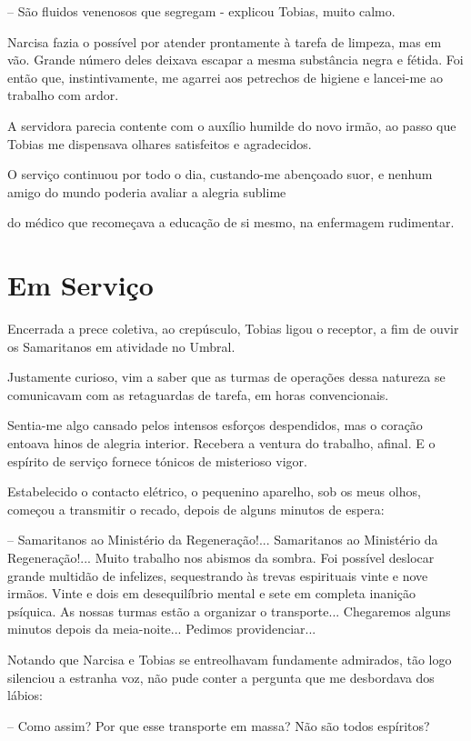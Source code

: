 \documentclass[portuguese,12pt,a4paper]{scrbook}
\begin{document}
	– São fluidos venenosos que segregam - explicou Tobias, muito calmo.
	
	Narcisa fazia o possível por atender prontamente à tarefa de limpeza, mas em vão. Grande número deles deixava escapar a mesma substância negra e fétida. Foi então que, instintivamente, me agarrei aos petrechos de higiene e lancei-me ao trabalho com ardor.
	
	A servidora parecia contente com o auxílio humilde do novo irmão, ao passo que Tobias me dispensava olhares satisfeitos e agradecidos.
	
	O serviço continuou por todo o dia, custando-me abençoado suor, e nenhum amigo do mundo poderia avaliar a alegria sublime
	
	
	do médico que recomeçava a educação de si mesmo, na enfermagem rudimentar.
	
	
	\chapter{Em Serviço}
	
	Encerrada a prece coletiva, ao crepúsculo, Tobias ligou o receptor, a fim de ouvir os Samaritanos em atividade no Umbral.
	
	Justamente curioso, vim a saber que as turmas de operações dessa natureza se comunicavam com as retaguardas de tarefa, em horas convencionais.
	
	Sentia-me algo cansado pelos intensos esforços despendidos, mas o coração entoava hinos de alegria interior. Recebera a ventura do trabalho, afinal. E o espírito de serviço fornece tónicos de misterioso vigor.
	
	Estabelecido o contacto elétrico, o pequenino aparelho, sob os meus olhos, começou a transmitir o recado, depois de alguns minutos de espera:
	
	– Samaritanos ao Ministério da Regeneração!... Samaritanos ao Ministério da Regeneração!... Muito trabalho nos abismos da sombra. Foi possível deslocar grande multidão de infelizes, sequestrando às trevas espirituais vinte e nove irmãos. Vinte e dois em desequilíbrio mental e sete em completa inanição psíquica. As nossas turmas estão a organizar o transporte... Chegaremos alguns minutos depois da meia-noite... Pedimos providenciar...
	
	Notando que Narcisa e Tobias se entreolhavam fundamente admirados, tão logo silenciou a estranha voz, não pude conter a pergunta que me desbordava dos lábios:
	
	– Como assim? Por que esse transporte em massa? Não são todos espíritos?
	
\end{document}
